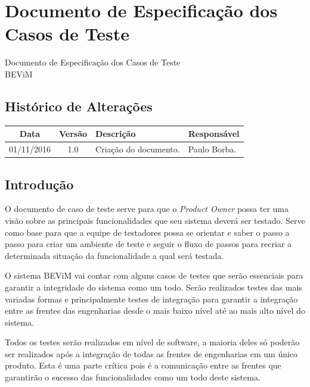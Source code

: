 \chapter{Documento de Especificação dos Casos de Teste} \label{documento_teste}

\begin{center}
 {\large Documento de Especificação dos Casos de Teste}\\[0.2cm]
 {BEViM}\\
 \end{center}

 \section*{Histórico de Alterações}
\begin{table}[h]
\centering
\begin{tabular}{|c|c|p{6cm}|p{5cm}|}
\hline
Data & Versão & Descrição & Responsável\\
\hline
01/11/2016 & 1.0 & Criação do documento. & Paulo Borba.\\
\hline
\end{tabular}
\end{table}

\section*{Introdução}

O documento de caso de teste serve para que o \textit{Product Owner} possa ter uma visão sobre as principais funcionalidades que seu sistema deverá ser testado. Serve como base para que a equipe de testadores possa se orientar e saber o passo a passo para criar um ambiente de teste e seguir o fluxo de passos para recriar a determinada situação da funcionalidade a qual será testada.

O sistema BEViM vai contar com alguns casos de testes que serão essenciais para garantir a integridade do sistema como um todo. Serão realizados testes das mais variadas formas e principalmente testes de integração para garantir a integração entre as frentes das engenharias desde o mais baixo nível até ao mais alto nível do sistema.

Todos os testes serão realizados em nível de software, a maioria deles só poderão ser realizados após a integração de todas as frentes de engenharias em um único produto. Esta é uma parte crítica pois é a comunicação entre as frentes que garantirão o sucesso das funcionalidades como um todo deste sistema.

